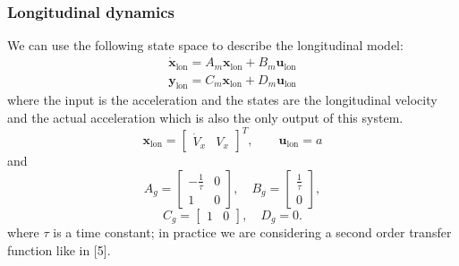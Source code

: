 \documentclass[conference, 11pt]{IEEEtran}
\begin{document}
\subsubsection{Longitudinal dynamics}
We can use the following state space to describe the longitudinal model:
\begin{equation}
\label{eqn:longi_dynamics_simple_model_ss}
\begin{array}{ll}
\dot{\textbf{x}}_{\text{lon}} =A_m \textbf{x}_{\text{lon}}+ B_m\textbf{u}_{\text{lon}}\\
\textbf{y}_{\text{lon}} =C_m \textbf{x}_{\text{lon}} + D_m \textbf{u}_{\text{lon}}
\end{array}
\end{equation}
where the input is the acceleration and the states are the longitudinal velocity and the actual acceleration which is also the only output of this system.
\begin{equation*}
\textbf{x}_{\text{lon}} = \begin{bmatrix}
\dot{V}_x&V_x
\end{bmatrix}^T,
\qquad
\textbf{u}_{\text{lon}} = a
\end{equation*}
and
\[ 
A_g=\begin{bmatrix}
-\frac{1}{\tau}&0\\1&0
\end{bmatrix},
\quad
B_g=\begin{bmatrix}
\frac{1}{\tau}\\
0
\end{bmatrix},
\]
\[
C_g=\begin{bmatrix}
1&0
\end{bmatrix}, 
\quad
D_g=0.
\]
where $\tau$ is a time constant; in practice we are considering a second order transfer function like in [5].
\end{document}
